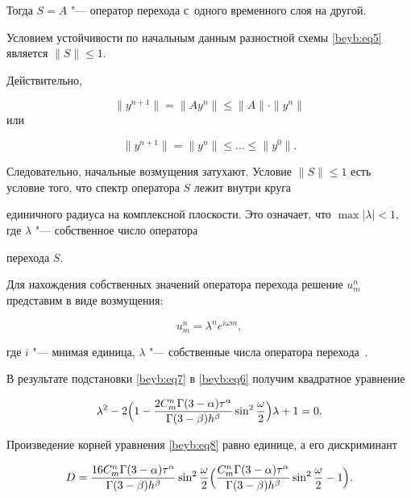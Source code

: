 Тогда $S=A$ "--- оператор перехода с~одного временного слоя на другой. 

Условием устойчивости по начальным данным разностной схемы \eqref{beyb:eq5} является $\| S

\| \le 1$. 

Действительно, 

$$\| y^{n+1} \|=\| Ay^n \| \le \| A \| \cdot \| y^n \|$$ или 

$$\|y^{n+1} \|= \| y^n \|\le \ldots \le \| y^0 \|.$$



Следовательно, начальные возмущения затухают. Условие $\| S \|\le

1$ есть условие того, что спектр оператора $S$ лежит внутри круга

единичного радиуса на комплексной плоскости. Это означает, что $\max

| \lambda |<1$, где $\lambda $ "--- собственное число оператора

перехода $S$.



Для нахождения собственных значений оператора перехода решение $u_m^n$ представим в виде возмущения:

\begin{equation}

\label{beyb:eq7}

 u_m^n =\lambda^ne^{i\omega m},

\end{equation}

где $i$ "--- мнимая единица, $\lambda$ "--- собственные числа оператора перехода~\cite{beyb:bib5}.



В результате подстановки \eqref{beyb:eq7} в \eqref{beyb:eq6} получим квадратное уравнение

\begin{equation}

\label{beyb:eq8}

\lambda^2-2

\Bigl(1-\frac{2C_m^n \Gamma (3-\alpha )\tau^\alpha}{\Gamma (3-\beta )h^\beta}\sin

^2\frac{\omega }{2}\Bigr)\lambda +1=0.

\end{equation}

Произведение корней уравнения \eqref{beyb:eq8} равно единице, а его дискриминант 

\begin{equation}

\label{beyb:eq9}

 D=\frac{16C_m^n \Gamma (3-\alpha )\tau ^\alpha }{\Gamma (3-\beta )h^\beta}\sin ^2\frac{\omega }{2}

 \Bigl(

\frac{C_m^n \Gamma (3-\alpha )\tau^\alpha }{\Gamma (3-\beta

)h^\beta }\sin^2\frac{\omega }{2}-1 \Bigr).

\end{equation}

